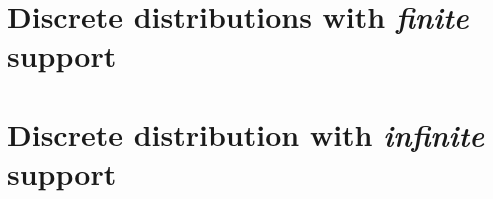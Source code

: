 \section{Discrete distributions with \emph{finite} support}

\section{Discrete distribution with \emph{infinite} support}

